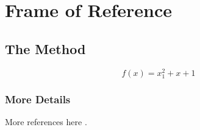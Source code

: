 \chapter{Frame of Reference} \label{chap:frameofreference}
\lipsum[13-14]

\section{The Method}

\lipsum[1]

\begin{equation}
\label{eq_the_method}
    f(x) = x_1^2 + x + 1
\end{equation}

\lipsum[2]

\subsection{More Details}

More references here \cite{krishnamurthy2003manageroverview,dedrick2006scope,henkel2006revealingemblinux,fitzgerald2003trencheslessons, entrywithurl}.

\lipsum[15-19]